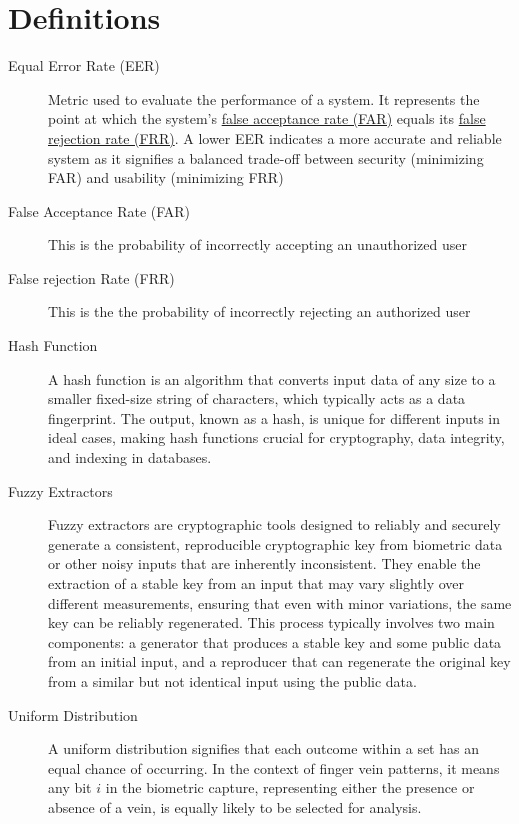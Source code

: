 \section{Definitions}
\begin{description}
    \item[Equal Error Rate (EER)] \label{def:EER} Metric used to evaluate the performance of a system. It represents the point at which the system's \hyperref[def:FAR]{false acceptance rate (FAR)} equals its \hyperref[def:FRR]{false rejection rate (FRR)}. A lower EER indicates a more accurate and reliable system as it signifies a balanced trade-off between security (minimizing FAR) and usability (minimizing FRR)

    \item[False Acceptance Rate (FAR)] \label{def:FAR} This is the probability of incorrectly accepting an unauthorized user

    \item[False rejection Rate (FRR)] \label{def:FRR} This is the the probability of incorrectly rejecting an authorized user

    \item[Hash Function] \label{def:Hash_Function} A hash function is an algorithm that converts input data of any size to a smaller fixed-size string of characters, which typically acts as a data fingerprint. The output, known as a hash, is unique for different inputs in ideal cases, making hash functions crucial for cryptography, data integrity, and indexing in databases.

    \item[Fuzzy Extractors] \label{def:Fuzzy_Extractors} Fuzzy extractors are cryptographic tools designed to reliably and securely generate a consistent, reproducible cryptographic key from biometric data or other noisy inputs that are inherently inconsistent. They enable the extraction of a stable key from an input that may vary slightly over different measurements, ensuring that even with minor variations, the same key can be reliably regenerated. This process typically involves two main components: a generator that produces a stable key and some public data from an initial input, and a reproducer that can regenerate the original key from a similar but not identical input using the public data.

    \item[Uniform Distribution] \label{def:Uniform Distribution} A uniform distribution signifies that each outcome within a set has an equal chance of occurring. In the context of finger vein patterns, it means any bit \(i\) in the biometric capture, representing either the presence or absence of a vein, is equally likely to be selected for analysis.


\end{description}
